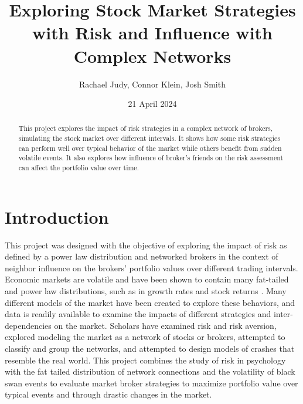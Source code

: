 \documentclass[letterpaper, 10 pt, proceedings]{ieeetran}
\title{Exploring Stock Market Strategies with Risk and Influence with Complex Networks}
\author{Rachael Judy, Connor Klein, Josh Smith}
\date{21 April 2024}
\begin{document}
	\pgfplotsset{compat=1.18}
	
	\maketitle

	\begin{abstract}
		This project explores the impact of risk strategies in a complex network of brokers, simulating the stock market over different intervals. It shows how some risk strategies can perform well over typical behavior of the market while others benefit from sudden volatile events. It also explores how influence of broker's friends on the risk assessment can affect the portfolio value over time. 
	\end{abstract}


	\section{Introduction}\label{sec:intro}
	This project was designed with the objective of exploring the impact of risk as defined by a power law distribution and networked brokers in the context of neighbor influence on the brokers' portfolio values over different trading intervals. Economic markets are volatile and have been shown to contain many fat-tailed and power law distributions, such as in growth rates and stock returns \cite{gabix_powerlaws}. Many different models of the market have been created to explore these behaviors, and data is readily available to examine the impacts of different strategies and inter-dependencies on the market. Scholars have examined risk and risk aversion, explored modeling the market as a network of stocks or brokers, attempted to classify and group the networks, and attempted to design models of crashes that resemble the real world. This project combines the study of risk in psychology with the fat tailed distribution of network connections and the volatility of black swan \cite{taleb_antifragile} events to evaluate market broker strategies to maximize portfolio value over typical events and through drastic changes in the market.
	
\end{document}
